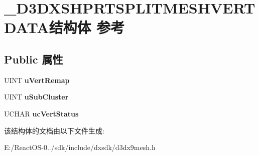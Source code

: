 \hypertarget{struct___d3_d_x_s_h_p_r_t_s_p_l_i_t_m_e_s_h_v_e_r_t_d_a_t_a}{}\section{\+\_\+\+D3\+D\+X\+S\+H\+P\+R\+T\+S\+P\+L\+I\+T\+M\+E\+S\+H\+V\+E\+R\+T\+D\+A\+T\+A结构体 参考}
\label{struct___d3_d_x_s_h_p_r_t_s_p_l_i_t_m_e_s_h_v_e_r_t_d_a_t_a}
\subsection*{Public 属性}
\begin{DoxyCompactItemize}
\item 
\mbox{\label{struct___d3_d_x_s_h_p_r_t_s_p_l_i_t_m_e_s_h_v_e_r_t_d_a_t_a_abe51622ee795a403a8375db855a6c648}} 
U\+I\+NT {\bfseries u\+Vert\+Remap}
\item 
\mbox{\label{struct___d3_d_x_s_h_p_r_t_s_p_l_i_t_m_e_s_h_v_e_r_t_d_a_t_a_ad0888bb0e2dbe7b34c5d7d5618f09f3b}} 
U\+I\+NT {\bfseries u\+Sub\+Cluster}
\item 
\mbox{\label{struct___d3_d_x_s_h_p_r_t_s_p_l_i_t_m_e_s_h_v_e_r_t_d_a_t_a_a8764e4a24ff9ff8ea910525b9a6d43b7}} 
U\+C\+H\+AR {\bfseries uc\+Vert\+Status}
\end{DoxyCompactItemize}


该结构体的文档由以下文件生成\+:\begin{DoxyCompactItemize}
\item 
E\+:/\+React\+O\+S-\/0../sdk/include/dxsdk/d3dx9mesh.\+h\end{DoxyCompactItemize}

